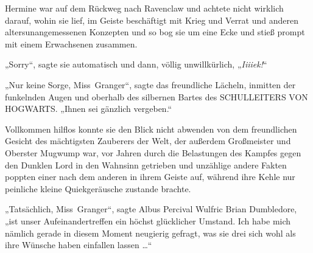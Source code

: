 \later

Hermine war auf dem Rückweg nach Ravenclaw und achtete nicht wirklich darauf, wohin sie lief, im Geiste beschäftigt mit Krieg und Verrat und anderen altersunangemessenen Konzepten und so bog sie um eine Ecke und stieß prompt mit einem Erwachsenen zusammen.

„Sorry“, sagte sie automatisch und dann, völlig unwillkürlich,
„\emph{Iiiiek!}“

„Nur keine Sorge, Miss~Granger“, sagte das freundliche Lächeln, inmitten der funkelnden Augen und oberhalb des silbernen Bartes des SCHULLEITERS VON HOGWARTS.
„Ihnen sei gänzlich vergeben.“

Vollkommen hilflos konnte sie den Blick nicht abwenden von dem freundlichen Gesicht des mächtigsten Zauberers der Welt, der außerdem Großmeister und Oberster Mugwump war, vor Jahren durch die Belastungen des Kampfes gegen den Dunklen Lord in den Wahnsinn getrieben und unzählige andere Fakten poppten einer nach dem anderen in ihrem Geiste auf, während ihre Kehle nur peinliche kleine Quiekgeräusche zustande brachte.

„Tatsächlich, Miss~Granger“, sagte Albus Percival Wulfric Brian Dumbledore, „ist unser Aufeinandertreffen ein höchst glücklicher Umstand. Ich habe mich nämlich gerade in diesem Moment neugierig gefragt, was sie drei sich wohl als ihre Wünsche haben einfallen lassen …“

\later

